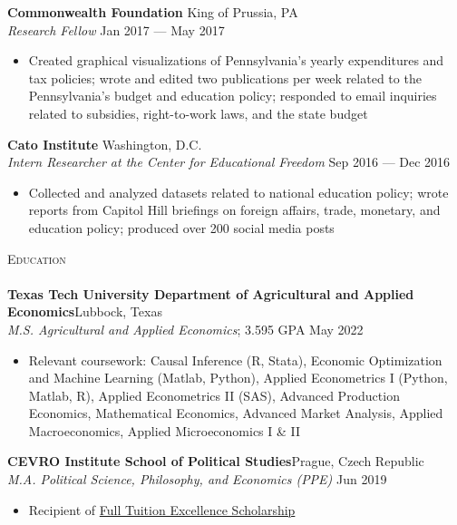 \documentclass[a4paper,11pt]{article}
\newcommand{\lineunder} {
    \vspace*{-8pt} \\
    \hspace*{-18pt} \hrulefill \\
}
\newcommand{\header} [1] {
    {\hspace*{-18pt}\vspace*{6pt} \textsc{\large{#1}}}
    \vspace*{-6pt} \lineunder
}
\begin{document}
\textbf{Commonwealth Foundation} \hfill \faMapMarker\space King of Prussia, PA\\
\textit{Research Fellow} \hfill \faCalendar\space Jan 2017 --- May 2017\\
\begin{itemize}
    \item Created graphical visualizations of Pennsylvania's yearly expenditures and tax policies; wrote and edited two publications per week related to the Pennsylvania's budget and education policy; responded to email inquiries related to subsidies, right-to-work laws, and the state budget
\end{itemize}

\textbf{Cato Institute} \hfill \faMapMarker\space Washington, D.C.\\
\textit{Intern Researcher at the Center for Educational Freedom} \hfill \faCalendar\space Sep 2016 --- Dec 2016\\
\begin{itemize}
    \item Collected and analyzed datasets related to national education policy; wrote reports from Capitol Hill briefings on foreign affairs, trade, monetary, and education policy; produced over 200 social media posts 
\end{itemize}
\vspace{1mm}

\header{Education}
\textbf{Texas Tech University Department of Agricultural and Applied Economics}\hfill \faMapMarker\space Lubbock, Texas\\
\textit{M.S. Agricultural and Applied Economics}; 3.595 GPA \hfill \faCalendar\space May 2022 \\
\begin{itemize}
    \item Relevant coursework: Causal Inference (R, Stata), Economic Optimization and Machine Learning (Matlab, Python), Applied Econometrics I (Python, Matlab, R), Applied Econometrics II (SAS), Advanced Production Economics, Mathematical Economics, Advanced Market Analysis, Applied Macroeconomics, Applied Microeconomics I \& II
\end{itemize}

\textbf{CEVRO Institute School of Political Studies}\hfill \faMapMarker\space Prague, Czech Republic\\
\textit{M.A. Political Science, Philosophy, and Economics (PPE)} \hfill \faCalendar\space Jun 2019\\
\begin{itemize}
    \item Recipient of \href{http://www.cevroinstitut.cz/en/article/scholarships/}{Full Tuition Excellence Scholarship}
\end{itemize}
\end{document}
